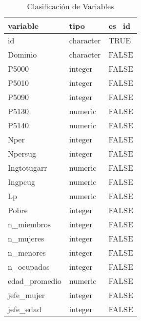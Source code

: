 \begin{table}[ht]
\centering
\begin{tabular}{lll}
  \toprule
variable & tipo & es\_id \\ 
  \midrule
id & character & TRUE \\ 
  Dominio & character & FALSE \\ 
  P5000 & integer & FALSE \\ 
  P5010 & integer & FALSE \\ 
  P5090 & integer & FALSE \\ 
  P5130 & numeric & FALSE \\ 
  P5140 & numeric & FALSE \\ 
  Nper & integer & FALSE \\ 
  Npersug & integer & FALSE \\ 
  Ingtotugarr & numeric & FALSE \\ 
  Ingpcug & numeric & FALSE \\ 
  Lp & numeric & FALSE \\ 
  Pobre & integer & FALSE \\ 
  n\_miembros & integer & FALSE \\ 
  n\_mujeres & integer & FALSE \\ 
  n\_menores & integer & FALSE \\ 
  n\_ocupados & integer & FALSE \\ 
  edad\_promedio & numeric & FALSE \\ 
  jefe\_mujer & integer & FALSE \\ 
  jefe\_edad & integer & FALSE \\ 
   \bottomrule
\end{tabular}
\caption{Clasificación de Variables} 
\label{tab:variables}
\end{table}
